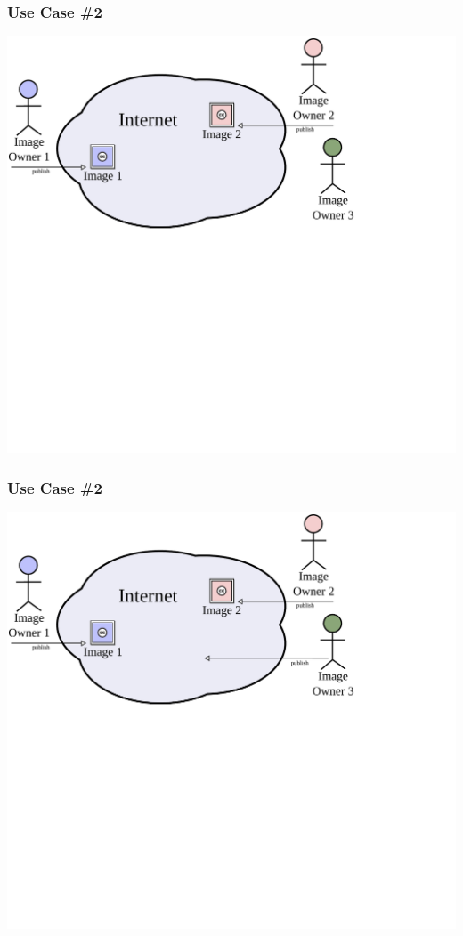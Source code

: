 \documentclass[mathserif,xcolor=dvipsnames,hyperref={bookmarks=true}]{beamer}
\begin{document}
    \begin{frame}[t]
        \frametitle{Use Case \#2}
        \begin{center}
            \includegraphics[width=0.9\textheight]{../resources/usecases/usecase2/usecase2-step08.pdf}
        \end{center}
    \end{frame}
    \begin{frame}[t]
        \frametitle{Use Case \#2}
        \begin{center}
            \includegraphics[width=0.9\textheight]{../resources/usecases/usecase2/usecase2-step09.pdf}
        \end{center}
    \end{frame}
\end{document}
